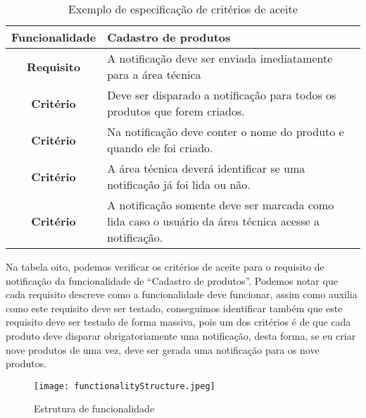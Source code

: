       \begin{table}[h!]
        \centering
        \begin{tabular}{|c|p{10cm}|}
          \hline
          \textbf{Funcionalidade} &
          Cadastro de produtos \\ \hline
          \textbf{Requisito} &
          A notificação deve ser enviada imediatamente para a área técnica \\ \hline
          \textbf{Critério} &
          Deve ser disparado a notificação para todos os produtos que forem criados. \\ \hline
          \textbf{Critério} &
          Na notificação deve conter o nome do produto e quando ele foi criado. \\ \hline
          \textbf{Critério} &
          A área técnica deverá identificar se uma notificação já foi lida ou não. \\ \hline
          \textbf{Critério} &
          A notificação somente deve ser marcada como lida caso o usuário da área
          técnica acesse a notificação. \\ \hline
        \end{tabular}
        \caption{Exemplo de especificação de critérios de aceite}
        \label{Tabela:8}
      \end{table}

      Na tabela oito, podemos verificar os critérios de aceite para o requisito de
      notificação da funcionalidade de “Cadastro de produtos”. Podemos notar que cada
      requisito descreve como a funcionalidade deve funcionar, assim como auxilia
      como este requisito deve ser testado, conseguimos identificar também que este
      requisito deve ser testado de forma massiva, pois um dos critérios é de que
      cada produto deve disparar obrigatoriamente uma notificação, desta forma, se
      eu criar nove produtos de uma vez, deve ser gerada uma notificação para os
      nove produtos. \newline

      \begin{figure}[!h]
        \centering
        \texttt{[image: functionalityStructure.jpeg]}
        \caption{Estrutura de funcionalidade}
        \label{Imagem:1}
      \end{figure}

